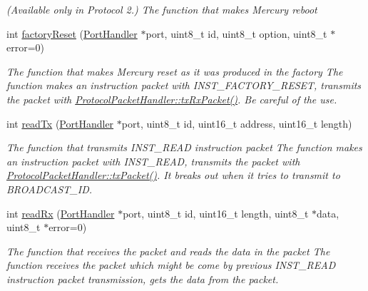 \begin{DoxyCompactItemize}
\begin{DoxyCompactList}\small\item\em (Available only in Protocol 2.) The function that makes Mercury reboot \end{DoxyCompactList}\item 
int \hyperlink{classmercury_1_1_protocol_packet_handler_ad658bff867e99f76c3b3c7cd93572041}{factory\+Reset} (\hyperlink{classmercury_1_1_port_handler}{Port\+Handler} $\ast$port, uint8\+\_\+t id, uint8\+\_\+t option, uint8\+\_\+t $\ast$error=0)
\begin{DoxyCompactList}\small\item\em The function that makes Mercury reset as it was produced in the factory  The function makes an instruction packet with I\+N\+S\+T\+\_\+\+F\+A\+C\+T\+O\+R\+Y\+\_\+\+R\+E\+S\+ET,  transmits the packet with \hyperlink{classmercury_1_1_protocol_packet_handler_a68b02f23af616886d0795ea12debd613}{Protocol\+Packet\+Handler\+::tx\+Rx\+Packet()}.  Be careful of the use. \end{DoxyCompactList}\item 
int \hyperlink{classmercury_1_1_protocol_packet_handler_aebb2c28d6b3f2e87c7a56b757a24810b}{read\+Tx} (\hyperlink{classmercury_1_1_port_handler}{Port\+Handler} $\ast$port, uint8\+\_\+t id, uint16\+\_\+t address, uint16\+\_\+t length)
\begin{DoxyCompactList}\small\item\em The function that transmits I\+N\+S\+T\+\_\+\+R\+E\+AD instruction packet  The function makes an instruction packet with I\+N\+S\+T\+\_\+\+R\+E\+AD,  transmits the packet with \hyperlink{classmercury_1_1_protocol_packet_handler_a245f01395d9684bc58788e8a06de3ffc}{Protocol\+Packet\+Handler\+::tx\+Packet()}.  It breaks out  when it tries to transmit to B\+R\+O\+A\+D\+C\+A\+S\+T\+\_\+\+ID. \end{DoxyCompactList}\item 
int \hyperlink{classmercury_1_1_protocol_packet_handler_af7ff32d0eca6395b92bf7efc02118a27}{read\+Rx} (\hyperlink{classmercury_1_1_port_handler}{Port\+Handler} $\ast$port, uint8\+\_\+t id, uint16\+\_\+t length, uint8\+\_\+t $\ast$data, uint8\+\_\+t $\ast$error=0)
\begin{DoxyCompactList}\small\item\em The function that receives the packet and reads the data in the packet  The function receives the packet which might be come by previous I\+N\+S\+T\+\_\+\+R\+E\+AD instruction packet transmission,  gets the data from the packet. \end{DoxyCompactList}\item 

\end{DoxyCompactItemize}
